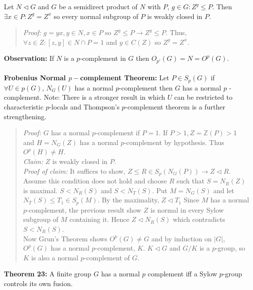 Let $N \lhd G$ and $G$ be a semidirect product of $N$ with $P$, $g \in G: Z^g \le P$.  Then
$\exists x \in P: Z^g = Z^x$ so every normal subgroup of $P$ is weakly closed in $P$.
\begin{quote} 
\emph{Proof:}  
$g=yx, y \in N, x \in P$ so $Z^g \le P \rightarrow Z^y \le P$.  Thus, $\forall z \in Z:
[z,y] \in N \cap P =1$ and $y \in C(Z)$ so $Z^g=Z^x$.
\end{quote}
{\bf Observation:} If $N$ is a $p$-complement in $G$ then $O_{p'}(G)=N=O^{p}(G)$.
\\
\\
{\bf Frobenius Normal $p-$complement Theorem:}  Let $P \in S_p(G)$ if $\forall U \in p(G)$,
$N_G(U)$ has a normal $p$-complement then $G$ has a normal $p$ -complement.  Note: There is a
stronger result in which $U$ can be restricted to characteristic $p$-locals and Thompson's
$p$-complement theorem is a further strengthening.
\begin{quote}
\emph{Proof:}  
$G$ has a normal $p$-complement if $P = 1$.  If $P > 1, Z={\mathbb Z}(P) > 1$ and $H= N_G(Z)$ has a normal $p$-complement
by hypothesis.  Thus $O^p(H) \ne H$.\\
\emph{Claim:} $Z$ is weakly closed in $P$.
\\
\emph{Proof of claim:}  It suffices to show, $Z \le R \in S_p(N_G(P)) \rightarrow
Z \lhd R$.  Assume this condition does not hold and choose $R$ such that
$S=N_R(Z)$ is maximal.  $S < N_R(S)$ and $S < N_T(S)$.  Put $M= N_G(S)$ and let
$N_T(S) \le T_1 \in S_p(M)$.  By the maximality, $Z \lhd T_1$  Since $M$ has a normal $p$-complement, the
previous result show $Z$ is normal in every Sylow subgroup of $M$ containing it.  Hence
$Z \lhd N_R(S)$ which contradicts $S < N_R(S)$.
\\
Now Grun's Theorem shows $O^p(G) \ne G$ and by induction on $|G|$, $O^p(G)$ has a normal $p$-complement, $K$.
$K \lhd G$ and $G/K$ is a $p$-group, so $K$ is also a normal $p$-complement of $G$.
\end{quote}
{\bf Theorem 23:} A finite group $G$ has a normal $p$ complement iff a Sylow $p$-group
controls its own fusion.  
